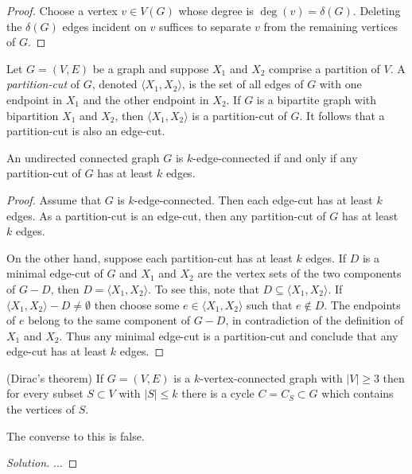 \begin{proof}
Choose a vertex $v \in V(G)$ whose degree is
$\deg(v) = \delta(G)$. Deleting the $\delta(G)$ edges incident on $v$
suffices to separate $v$ from the remaining vertices of $G$.
\end{proof}

Let $G = (V,E)$ be a graph and suppose $X_1$ and $X_2$ comprise a
partition of $V$. A \emph{partition-cut} of $G$, denoted
$\langle X_1, X_2 \rangle$, is the set of all edges of $G$ with one
endpoint in $X_1$ and the other endpoint in $X_2$. If $G$ is a
bipartite graph with bipartition $X_1$ and $X_2$, then
$\langle X_1, X_2 \rangle$ is a partition-cut of $G$. It follows that
a partition-cut is also an edge-cut.

\begin{proposition}
An undirected connected graph $G$ is $k$-edge-connected if and only if
any partition-cut of $G$ has at least $k$ edges.
\end{proposition}

\begin{proof}
Assume that $G$ is $k$-edge-connected. Then each edge-cut has at least
$k$ edges. As a partition-cut is an edge-cut, then any partition-cut
of $G$ has at least $k$ edges.

On the other hand, suppose each partition-cut has at least $k$
edges. If $D$ is a minimal edge-cut of $G$ and $X_1$ and $X_2$ are the
vertex sets of the two components of $G - D$, then
$D = \langle X_1, X_2 \rangle$. To see this, note that
$D \subseteq \langle X_1, X_2 \rangle$. If
$\langle X_1, X_2 \rangle - D \neq \emptyset$ then choose some
$e \in \langle X_1, X_2 \rangle$ such that $e \notin D$. The endpoints
of $e$ belong to the same component of $G - D$, in contradiction of
the definition of $X_1$ and $X_2$. Thus any minimal edge-cut is a
partition-cut and conclude that any edge-cut has at least $k$ edges.
\end{proof}

\begin{theorem}
(Dirac's theorem)
{\rm
If $G=(V,E)$ is a $k$-vertex-connected graph with
$|V|\geq 3$ then for every subset $S\subset V$ with
$|S|\leq k$ there is a cycle $C=C_S\subset G$ which contains
the vertices of $S$.
}
\end{theorem}

The converse to this is false.

\begin{proof}[Solution]
...
\end{proof}


